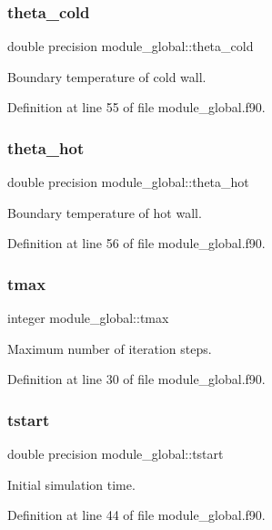 \subsubsection{\texorpdfstring{theta\_cold}{theta\_cold}}
{\footnotesize\ttfamily double precision module\+\_\+global\+::theta\+\_\+cold}



Boundary temperature of cold wall. 



Definition at line 55 of file module\+\_\+global.\+f90.

\mbox{\label{namespacemodule__global_a3631c83fdd972ed87e810c7f1c91cd46}} 
\subsubsection{\texorpdfstring{theta\_hot}{theta\_hot}}
{\footnotesize\ttfamily double precision module\+\_\+global\+::theta\+\_\+hot}



Boundary temperature of hot wall. 



Definition at line 56 of file module\+\_\+global.\+f90.

\mbox{\label{namespacemodule__global_aa2a5d817a73795a7801b3cccd372e9aa}} 
\subsubsection{\texorpdfstring{tmax}{tmax}}
{\footnotesize\ttfamily integer module\+\_\+global\+::tmax}



Maximum number of iteration steps. 



Definition at line 30 of file module\+\_\+global.\+f90.

\mbox{\label{namespacemodule__global_a9adeb19eb4726dcc57576c2dbc89297b}} 
\subsubsection{\texorpdfstring{tstart}{tstart}}
{\footnotesize\ttfamily double precision module\+\_\+global\+::tstart}



Initial simulation time. 



Definition at line 44 of file module\+\_\+global.\+f90.

